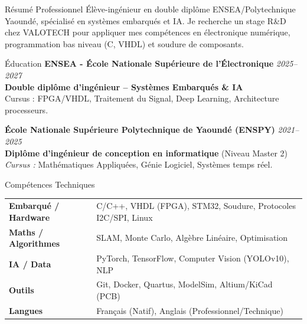 \documentclass[10pt]{resume}
\begin{document}
\begin{rSection}{Résumé Professionnel}
Élève-ingénieur en double diplôme ENSEA/Polytechnique Yaoundé, spécialisé en systèmes embarqués et IA. Je recherche un stage R\&D chez VALOTECH pour appliquer mes compétences en électronique numérique, programmation bas niveau (C, VHDL) et soudure de composants.
\end{rSection}

\begin{rSection}{Éducation}
{\bf ENSEA - École Nationale Supérieure de l'Électronique} \hfill {\em 2025--2027}\\
\textbf{Double diplôme d'ingénieur -- Systèmes Embarqués \& IA}\\
Cursus : FPGA/VHDL, Traitement du Signal, Deep Learning, Architecture processeurs.

{\bf École Nationale Supérieure Polytechnique de Yaoundé (ENSPY)} \hfill {\em 2021--2025}\\
\textbf{Diplôme d'ingénieur de conception en informatique} (Niveau Master 2)\\
\textit{Cursus :} Mathématiques Appliquées, Génie Logiciel, Systèmes temps réel.
\end{rSection}

\begin{rSection}{Compétences Techniques}
\begin{tabular}{ @{} >{\bfseries}l @{\hspace{6ex}} l }
Embarqué / Hardware & C/C++, VHDL (FPGA), STM32, Soudure, Protocoles I2C/SPI, Linux \\
Maths / Algorithmes & SLAM, Monte Carlo, Algèbre Linéaire, Optimisation \\
IA / Data & PyTorch, TensorFlow, Computer Vision (YOLOv10), NLP \\
Outils & Git, Docker, Quartus, ModelSim, Altium/KiCad (PCB) \\
Langues & Français (Natif), Anglais (Professionnel/Technique)
\end{tabular}
\end{rSection}
\end{document}
